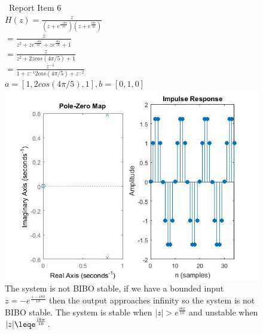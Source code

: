 \documentclass{article}
\begin{document}
\begin{figure}[H]
\ Report Item 6
\\ $H(z) = \frac{z}{{(z+e^{\frac{-i8\pi}{10}})(z+e^{\frac{i8\pi}{10}})}}$
\\ $ = \frac{z}{z^2 + ze^{\frac{-i8\pi}{10}} + ze^{\frac{i8\pi}{10}} + 1}$
\\ $ = \frac{z}{z^2+2zcos(4\pi/5) + 1}$
\\ $ = \frac{z^{-1}}{1 + z^{-1}2cos(4\pi/5) + z^{-2}}$
\\ $ a = [1,2cos(4\pi/5),1], b = [0,1,0]$
\includegraphics[scale = .5]{report6}
\\ The system is not BIBO stable, if we have a bounded input $z = -e^{\frac{+-i8\pi}{10}}$ then the output approaches infinity so the system is not BIBO stable. The system is stable when $|z| > e^{\frac{i8\pi}{10}}$ and unstable when $|z|\leqe^{\frac{i8\pi}{10}}$.
\end{figure}



\break
\end{document}
